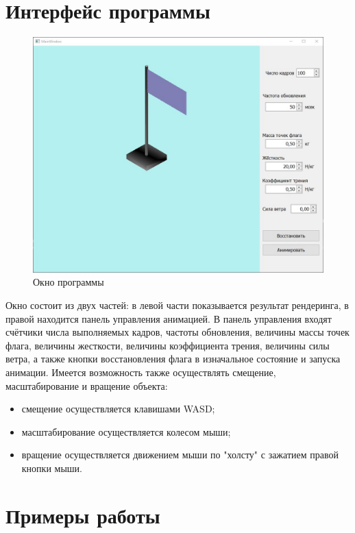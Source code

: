 \section{Интерфейс программы}

\begin{figure}[ht!]
	\centering
	\includegraphics[scale=0.65]{gui.jpg}
	\caption{Окно программы}
	\label{fig:gui}
\end{figure}

\hspace{0.6cm} Окно состоит из двух частей: в левой части показывается результат рендеринга, в правой находится панель управления анимацией. В панель управления входят счётчики числа выполняемых кадров, частоты обновления, величины массы точек флага, величины жесткости, величины коэффициента трения, величины силы ветра, а также кнопки восстановления флага в изначальное состояние и запуска анимации.
Имеется возможность также осуществлять смещение, масштабирование и вращение объекта:
\begin{itemize}
	\item смещение осуществляется клавишами WASD;
	\item масштабирование осуществляется колесом мыши;
	\item вращение осуществляется движением мыши по "холсту" с зажатием правой кнопки мыши.
\end{itemize}

\section{Примеры работы}

